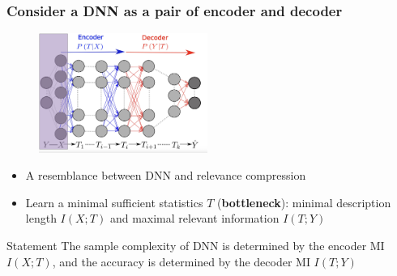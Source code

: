 \documentclass{beamer}
\begin{document}
\begin{frame}
    \frametitle{Consider a DNN as a pair of encoder and decoder}
    \begin{figure}
        \centering
        \includegraphics[width=5.5cm]{IB_encoder_decoder.jpg}
    \end{figure}
    \begin{itemize}
        \item A resemblance between DNN and relevance compression
        \item Learn a minimal sufficient statistics $T$ (\textbf{bottleneck}): minimal description length $I(X;T)$ and maximal relevant information $I(T;Y)$
    \end{itemize}
    \begin{block}{Statement \cite{IB-DNN}}
        The sample complexity of DNN is determined by the encoder MI $I(X;T)$, and the accuracy is determined by the decoder MI $I(T;Y)$
    \end{block}
\end{frame}
\end{document}
